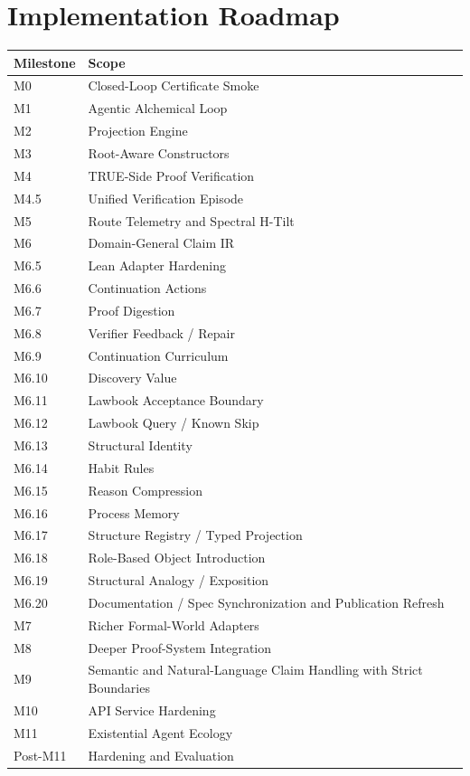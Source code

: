 \documentclass[11pt,a4paper]{article}
\begin{document}
\section{Implementation Roadmap}
\begin{longtable}{ll}
\toprule
Milestone & Scope\\
\midrule
M0 & Closed-Loop Certificate Smoke\\
M1 & Agentic Alchemical Loop\\
M2 & Projection Engine\\
M3 & Root-Aware Constructors\\
M4 & TRUE-Side Proof Verification\\
M4.5 & Unified Verification Episode\\
M5 & Route Telemetry and Spectral H-Tilt\\
M6 & Domain-General Claim IR\\
M6.5 & Lean Adapter Hardening\\
M6.6 & Continuation Actions\\
M6.7 & Proof Digestion\\
M6.8 & Verifier Feedback / Repair\\
M6.9 & Continuation Curriculum\\
M6.10 & Discovery Value\\
M6.11 & Lawbook Acceptance Boundary\\
M6.12 & Lawbook Query / Known Skip\\
M6.13 & Structural Identity\\
M6.14 & Habit Rules\\
M6.15 & Reason Compression\\
M6.16 & Process Memory\\
M6.17 & Structure Registry / Typed Projection\\
M6.18 & Role-Based Object Introduction\\
M6.19 & Structural Analogy / Exposition\\
M6.20 & Documentation / Spec Synchronization and Publication Refresh\\
M7 & Richer Formal-World Adapters\\
M8 & Deeper Proof-System Integration\\
M9 & Semantic and Natural-Language Claim Handling with Strict Boundaries\\
M10 & API Service Hardening\\
M11 & Existential Agent Ecology\\
Post-M11 & Hardening and Evaluation\\

\end{longtable}
\end{document}
